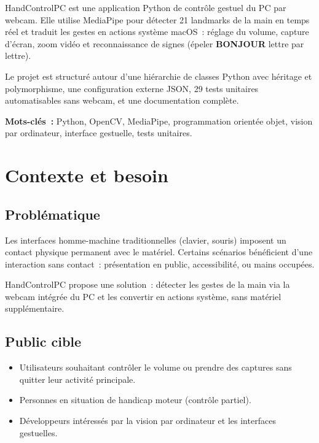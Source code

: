 \documentclass[12pt,a4paper]{article}
\begin{document}
\noindent HandControlPC est une application Python de contr\^ole gestuel du PC par webcam.
Elle utilise MediaPipe pour d\'etecter 21 landmarks de la main en temps r\'eel et traduit
les gestes en actions syst\`eme macOS~: r\'eglage du volume, capture d'\'ecran, zoom vid\'eo
et reconnaissance de signes (\'epeler \textbf{BONJOUR} lettre par lettre).

Le projet est structur\'e autour d'une hi\'erarchie de classes Python avec h\'eritage et
polymorphisme, une configuration externe JSON, 29 tests unitaires automatisables sans
webcam, et une documentation compl\`ete.

\vspace{0.3cm}
\noindent\textbf{Mots-cl\'es~:} Python, OpenCV, MediaPipe, programmation orient\'ee objet,
vision par ordinateur, interface gestuelle, tests unitaires.

\newpage

\section{Contexte et besoin}
\label{sec:contexte}

\subsection{Probl\'ematique}

Les interfaces homme-machine traditionnelles (clavier, souris) imposent un contact physique
permanent avec le mat\'eriel. Certains sc\'enarios b\'en\'eficient d'une interaction sans contact~:
pr\'esentation en public, accessibilit\'e, ou mains occup\'ees.

HandControlPC propose une solution~: d\'etecter les gestes de la main via la webcam int\'egr\'ee
du PC et les convertir en actions syst\`eme, sans mat\'eriel suppl\'ementaire.

\subsection{Public cible}

\begin{itemize}
  \item Utilisateurs souhaitant contr\^oler le volume ou prendre des captures sans quitter leur
        activit\'e principale.
  \item Personnes en situation de handicap moteur (contr\^ole partiel).
  \item D\'eveloppeurs int\'eress\'es par la vision par ordinateur et les interfaces gestuelles.
\end{itemize}
\end{document}
